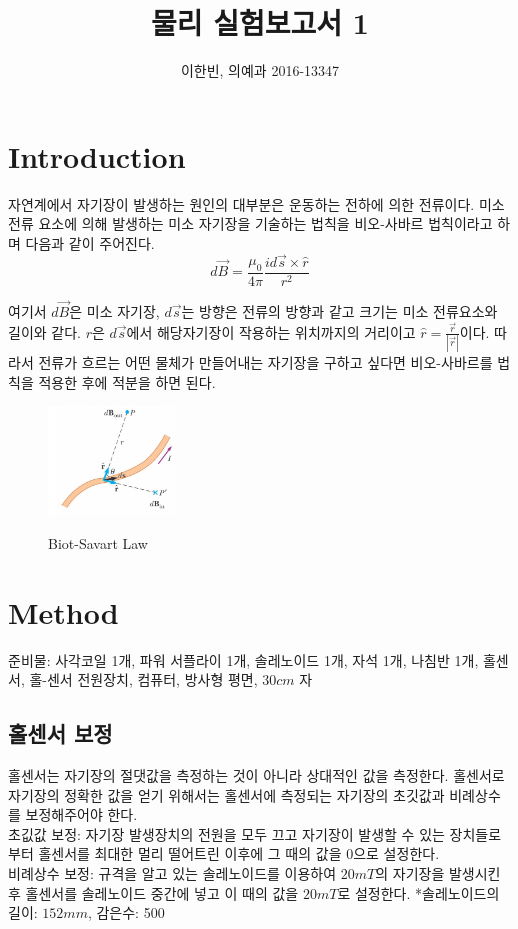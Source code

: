 \documentclass[a4paper]{article}
\title{물리 실험보고서 1}
\author{이한빈, 의예과 2016-13347}
\begin{document}
\maketitle

\section{Introduction}
	자연계에서 자기장이 발생하는 원인의 대부분은 운동하는 전하에 의한 전류이다.
	미소 전류 요소에 의해 발생하는 미소 자기장을 기술하는 법칙을 비오-사바르 법칙이라고 하며 다음과 같이 주어진다.
	\begin{equation}
		d\vec{B} = \frac{\mu_{0}}{4\pi} \frac{id\vec{s} \times \hat{r}}{r^2}
		\label{eq:biot}
	\end{equation}

	여기서 $d\vec{B}$은 미소 자기장, $d\vec{s}$는 방향은 전류의 방향과 같고 크기는 미소 전류요소와 길이와 같다.
	$r$은 $d\vec{s}$에서 해당자기장이 작용하는 위치까지의 거리이고 $\hat{r} = \frac{\vec{r}}{|\vec{r}|}$이다.
	따라서 전류가 흐르는 어떤 물체가 만들어내는 자기장을 구하고 싶다면 비오-사바르를 법칙을 적용한 후에 적분을 하면 된다. 
	\begin{figure}[h]
		\centering
		\includegraphics[width=0.3\textwidth]{img/biot.png}
		\label{fig:biot} 
		\caption{Biot-Savart Law}
	\end{figure}

\section{Method}
	준비물: 사각코일 1개, 파워 서플라이 1개, 솔레노이드 1개, 자석 1개, 나침반 1개, 홀센서, 홀-센서 전원장치, 컴퓨터, 방사형 평면, $30\si{cm}$ 자
	\subsection{홀센서 보정}
		홀센서는 자기장의 절댓값을 측정하는 것이 아니라 상대적인 값을 측정한다.
		홀센서로 자기장의 정확한 값을 얻기 위해서는 홀센서에 측정되는 자기장의 초깃값과 비례상수를 보정해주어야 한다. \\
		초깂값 보정: 자기장 발생장치의 전원을 모두 끄고 자기장이 발생할 수 있는 장치들로부터 홀센서를 최대한 멀리 떨어트린 이후에 그 때의 값을 0으로 설정한다. \\
		비례상수 보정: 규격을 알고 있는 솔레노이드를 이용하여 $20\si{mT}$의 자기장을 발생시킨 후 홀센서를 솔레노이드 중간에 넣고 이 때의 값을 $20\si{mT}$로 설정한다.
		*솔레노이드의 길이: $152\si{mm}$, 감은수: 500
\end{document}
